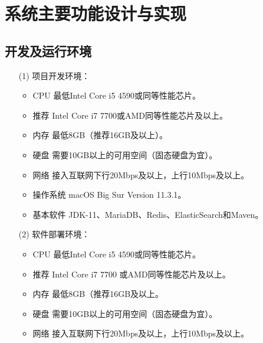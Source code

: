 \chapter{系统主要功能设计与实现}

\section{开发及运行环境}
\begin{enumerate}
	\item[(1)] 项目开发环境：
		\begin{itemize}
			\item CPU 最低Intel Core i5 4590或同等性能芯片。
			\item 推荐 Intel Core i7 7700或AMD同等性能芯片及以上。
			\item 内存 最低8GB（推荐16GB及以上）。
			\item 硬盘 需要10GB以上的可用空间（固态硬盘为宜）。
			\item 网络 接入互联网下行20Mbps及以上，上行10Mbps及以上。
			\item 操作系统 macOS Big Sur Version 11.3.1。
			\item 基本软件 JDK-11、MariaDB、Redis、ElasticSearch和Maven。
		\end{itemize}
	\item[(2)] 软件部署环境：
		\begin{itemize}
			\item CPU 最低Intel Core i5 4590或同等性能芯片。
			\item 推荐 Intel Core i7 7700 或AMD同等性能芯片及以上。
			\item 内存 最低8GB（推荐16GB及以上。
			\item 硬盘 需要10GB以上的可用空间（固态硬盘为宜）。
			\item 网络 接入互联网下行20Mbps及以上，上行10Mbps及以上。
		\end{itemize}
\end{enumerate}

